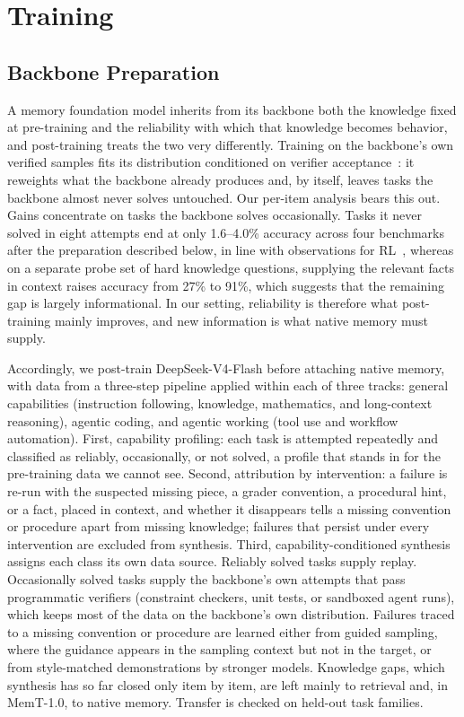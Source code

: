 \section{Training}
\label{sec:training}
\subsection{Backbone Preparation}
\label{sec:backbone_prep}
A memory foundation model inherits from its backbone both the knowledge fixed at pre-training and the reliability with which that knowledge becomes behavior, and post-training treats the two very differently. Training on the backbone's own verified samples fits its distribution conditioned on verifier acceptance~\cite{zelikman2022star,singh2024beyond}: it reweights what the backbone already produces and, by itself, leaves tasks the backbone almost never solves untouched. Our per-item analysis bears this out. Gains concentrate on tasks the backbone solves occasionally. Tasks it never solved in eight attempts end at only 1.6--4.0\% accuracy across four benchmarks after the preparation described below, in line with observations for RL~\cite{yue2025does}, whereas on a separate probe set of hard knowledge questions, supplying the relevant facts in context raises accuracy from 27\% to 91\%, which suggests that the remaining gap is largely informational. In our setting, reliability is therefore what post-training mainly improves, and new information is what native memory must supply.

Accordingly, we post-train DeepSeek-V4-Flash before attaching native memory, with data from a three-step pipeline applied within each of three tracks: general capabilities (instruction following, knowledge, mathematics, and long-context reasoning), agentic coding, and agentic working (tool use and workflow automation). First, capability profiling: each task is attempted repeatedly and classified as reliably, occasionally, or not solved, a profile that stands in for the pre-training data we cannot see. Second, attribution by intervention: a failure is re-run with the suspected missing piece, a grader convention, a procedural hint, or a fact, placed in context, and whether it disappears tells a missing convention or procedure apart from missing knowledge; failures that persist under every intervention are excluded from synthesis. Third, capability-conditioned synthesis assigns each class its own data source. Reliably solved tasks supply replay. Occasionally solved tasks supply the backbone's own attempts that pass programmatic verifiers (constraint checkers, unit tests, or sandboxed agent runs), which keeps most of the data on the backbone's own distribution. Failures traced to a missing convention or procedure are learned either from guided sampling, where the guidance appears in the sampling context but not in the target, or from style-matched demonstrations by stronger models. Knowledge gaps, which synthesis has so far closed only item by item, are left mainly to retrieval and, in MemT-1.0, to native memory. Transfer is checked on held-out task families.

